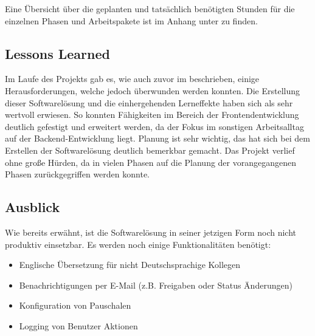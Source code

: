 Eine Übersicht über die geplanten und tatsächlich benötigten Stunden für die einzelnen Phasen und Arbeitspakete ist im Anhang unter  zu finden.

\subsection{Lessons Learned}
\label{sec:Abschlussphase:Lessons Learned}

Im Laufe des Projekts gab es, wie auch zuvor im  beschrieben, einige Herausforderungen, welche jedoch überwunden werden konnten. Die Erstellung dieser Softwarelösung und die einhergehenden Lerneffekte haben sich als sehr wertvoll erwiesen. So konnten Fähigkeiten im Bereich der Frontendentwicklung deutlich gefestigt und erweitert werden, da der Fokus im sonstigen Arbeitsalltag auf der Backend-Entwicklung liegt. Planung ist sehr wichtig, das hat sich bei dem Erstellen der Softwarelösung deutlich bemerkbar gemacht. Das Projekt verlief ohne große Hürden, da in vielen Phasen auf die Planung der vorangegangenen Phasen zurückgegriffen werden konnte.

\subsection{Ausblick}
\label{sec:Abschlussphase:Ausblick}
Wie bereits erwähnt, ist die Softwarelösung in seiner jetzigen Form noch nicht produktiv einsetzbar. Es werden noch einige Funktionalitäten benötigt:

\begin{itemize}
    \item Englische Übersetzung für nicht Deutschsprachige Kollegen
    \item Benachrichtigungen per E-Mail (z.B. Freigaben oder Status Änderungen)
    \item Konfiguration von Pauschalen
    \item Logging von Benutzer Aktionen
\end{itemize}
